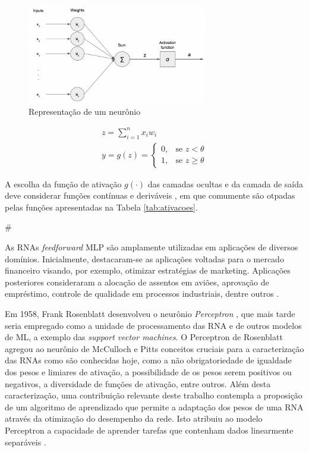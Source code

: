 \begin{figure}[ht]
	\centering
	\includegraphics[width=0.7\textwidth]{img/perceptron.png}
	\caption{Representação de um neurônio}
	\label{fig:neuronio}
\end{figure}

\begin{gather}\label{eq:funcao_neuronio}
	z = \sum_{i=1}^n x_i w_i\\
	y = g(z) =
		\begin{cases}
			0, & \text{se } z < \theta\\
			1, & \text{se } z \geq \theta
		\end{cases}
\end{gather}

A escolha da função de ativação $g(\cdot)$ das camadas ocultas e da camada de saída deve considerar funções contínuas e deriváveis \cite{hornik1991approximation}, em que comumente são otpadas pelas funções apresentadas na Tabela  \ref{tab:ativacoes}.


#



As RNAs \emph{feedforward} MLP são amplamente utilizadas em aplicações de diversos domínios. Inicialmente, destacaram-se as aplicações voltadas para o mercado financeiro visando, por exemplo, otimizar estratégias de marketing. Aplicações posteriores consideraram a alocação de assentos em aviões, aprovação de empréstimo, controle de qualidade em processos industriais, dentre outros \cite{widrow1994neural}.

Em 1958, Frank Rosenblatt desenvolveu o neurônio \emph{Perceptron} \cite{rosenblatt1958perceptron}, que mais tarde seria empregado como a unidade de processamento das RNA e de outros modelos de ML, a exemplo das \emph{support vector machines}. O Perceptron de Rosenblatt agregou ao neurônio de McCulloch e Pitts conceitos cruciais para a caracterização das RNAs como são conhecidas hoje, como a não obrigatoriedade de igualdade dos pesos e limiares de ativação, a possibilidade de os pesos serem positivos ou negativos, a diversidade de funções de ativação, entre outros. Além desta caracterização, uma contribuição relevante deste trabalho contempla a proposição de um algoritmo de aprendizado que permite a adaptação dos pesos de uma RNA através da otimização do desempenho da rede. Isto atribuiu ao modelo Perceptron a capacidade de aprender tarefas que contenham dados linearmente separáveis \cite{Teresa:Livro}.

